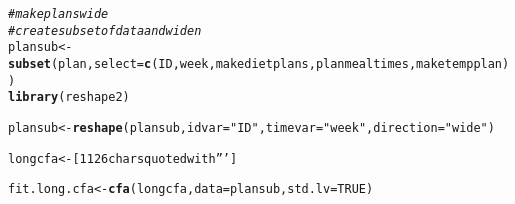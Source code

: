 \documentclass{article}\usepackage[]{graphicx}\usepackage[]{color}
\makeatletter
\newcommand{\hlnum}[1]{\textcolor[rgb]{0.686,0.059,0.569}{#1}}%
\newcommand{\hlstr}[1]{\textcolor[rgb]{0.192,0.494,0.8}{#1}}%
\newcommand{\hlcom}[1]{\textcolor[rgb]{0.678,0.584,0.686}{\textit{#1}}}%
\newcommand{\hlstd}[1]{\textcolor[rgb]{0.345,0.345,0.345}{#1}}%
\newcommand{\hlkwb}[1]{\textcolor[rgb]{0.69,0.353,0.396}{#1}}%
\newcommand{\hlkwc}[1]{\textcolor[rgb]{0.333,0.667,0.333}{#1}}%
\newcommand{\hlkwd}[1]{\textcolor[rgb]{0.737,0.353,0.396}{\textbf{#1}}}%
\newenvironment{kframe}{%
 \def\at@end@of@kframe{}%
 \ifinner\ifhmode%
  \def\at@end@of@kframe{\end{minipage}}%
  \begin{minipage}{\columnwidth}%
 \fi\fi%
 \def\FrameCommand##1{\hskip\@totalleftmargin \hskip-\fboxsep
 \colorbox{shadecolor}{##1}\hskip-\fboxsep
     \hskip-\linewidth \hskip-\@totalleftmargin \hskip\columnwidth}%
 \MakeFramed {\advance\hsize-\width
   \@totalleftmargin\z@ \linewidth\hsize
   \@setminipage}}%
 {\par\unskip\endMakeFramed%
 \at@end@of@kframe}
\newenvironment{knitrout}{}{} %
\makeatother
\begin{document}
\begin{knitrout}
\color{fgcolor}\begin{kframe}
\begin{alltt}
\hlcom{#make plans wide}
\hlcom{#create subset of data and widen}
\hlstd{plansub} \hlkwb{<-} \hlkwd{subset}\hlstd{(plan,} \hlkwc{select} \hlstd{=} \hlkwd{c}\hlstd{(ID, week, makedietplans, planmealtimes, maketempplan))}
\hlkwd{library}\hlstd{(reshape2)}
\end{alltt}


{\ttfamily\noindent\itshape\color{messagecolor}{\#\# \\\#\# Attaching package: 'reshape2'}}

{\ttfamily\noindent\itshape\color{messagecolor}{\#\# The following object is masked from 'package:tidyr':\\\#\# \\\#\#\ \ \ \  smiths}}\begin{alltt}
\hlstd{plansub} \hlkwb{<-} \hlkwd{reshape}\hlstd{(plansub,} \hlkwc{idvar} \hlstd{=} \hlstr{"ID"}\hlstd{,} \hlkwc{timevar} \hlstd{=} \hlstr{"week"}\hlstd{,} \hlkwc{direction} \hlstd{=} \hlstr{"wide"}\hlstd{)}

\hlstd{longcfa} \hlkwb{<-} \hlstr{[1126 chars quoted with ''']}

\hlstd{fit.long.cfa} \hlkwb{<-} \hlkwd{cfa}\hlstd{(longcfa,} \hlkwc{data}\hlstd{=plansub,} \hlkwc{std.lv}\hlstd{=}\hlnum{TRUE}\hlstd{)}
\end{alltt}


{\ttfamily\noindent\color{warningcolor}{\#\# Warning in lav\_model\_vcov(lavmodel = lavmodel, lavsamplestats = lavsamplestats, : lavaan WARNING: could not compute standard errors!\\\#\#\ \  lavaan NOTE: this may be a symptom that the model is not identified.}}


\end{kframe}
\end{knitrout}
\end{document}
